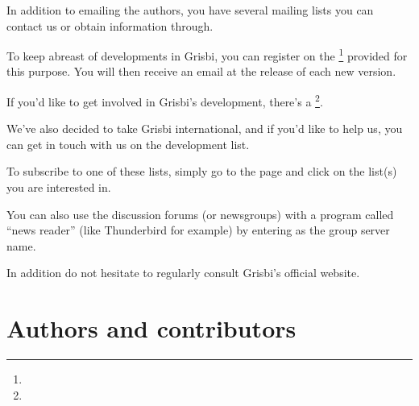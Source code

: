 In addition to emailing the authors, you have several mailing lists you can contact us or obtain information through.

To keep abreast of developments in Grisbi, you can register on the \footnote{\urlListInfoEmail{}} provided for this purpose.  You will then receive an email at the release of each new version.

If you'd like to get involved in Grisbi's development, there's a \footnote{\urlListDevelEmail{}}.


We've also decided to take Grisbi international, and if you'd like to help us, you can get in touch with us on the development list.



To subscribe to one of these lists, simply go to the \urlListDiffGrisbi{} page and click on the list(s) you are interested in.

You can also use the discussion forums (or newsgroups) with a program called ``news reader'' (like Thunderbird for example) by entering  as the group server name.

In addition do not hesitate to regularly consult Grisbi's official website.



\section{Authors and contributors\label{introduction-authors}} %

